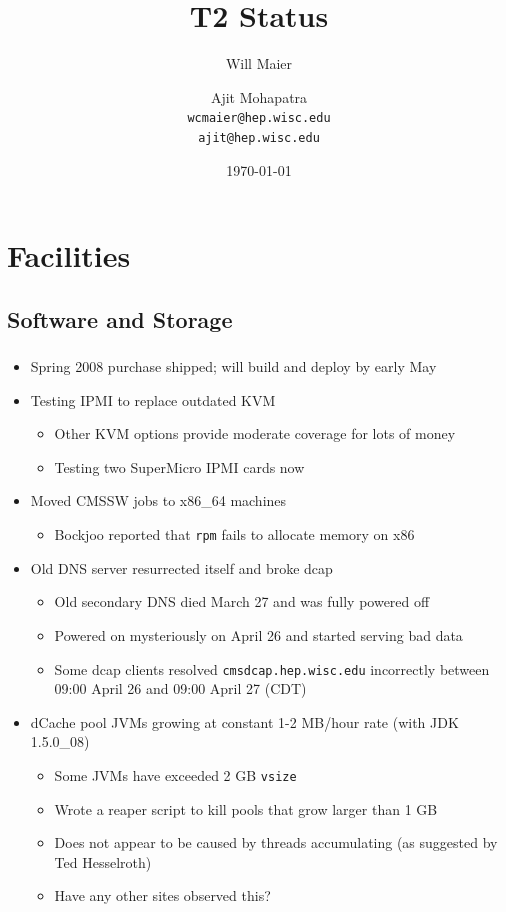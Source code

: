 \documentclass{beamer}
\title{T2 Status}
\author[Maier, Mohapatra]{
    Will Maier \and Ajit Mohapatra\\ 
    {\tt wcmaier@hep.wisc.edu}\\
    {\tt ajit@hep.wisc.edu}}
\institute[Wisconsin]{University of Wisconsin - High Energy Physics}
\date{\today}
\begin{document}
\begin{frame}
    \titlepage
\end{frame}


\section{Facilities}
\subsection{Software and Storage}
\begin{frame}
\frametitle{}
\begin{itemize}
    \item Spring 2008 purchase shipped; will build and deploy by early May
    \item Testing IPMI to replace outdated KVM
    \begin{itemize}
        \item Other KVM options provide moderate coverage for lots of money
        \item Testing two SuperMicro IPMI cards now
    \end{itemize}
    \item Moved CMSSW jobs to x86\_64 machines
    \begin{itemize}
        \item Bockjoo reported that {\tt rpm} fails to allocate memory on x86
    \end{itemize}
    \item Old DNS server resurrected itself and broke dcap
    \begin{itemize}
        \item Old secondary DNS died March 27 and was fully powered off
        \item Powered on mysteriously on April 26 and started serving bad data
        \item Some dcap clients resolved {\tt cmsdcap.hep.wisc.edu} incorrectly between 09:00 April 26 and 09:00 April 27 (CDT)
    \end{itemize}
    \item dCache pool JVMs growing at constant 1-2 MB/hour rate (with JDK 1.5.0\_08)
    \begin{itemize}
        \item Some JVMs have exceeded 2 GB {\tt vsize}
        \item Wrote a reaper script to kill pools that grow larger than 1 GB
        \item Does not appear to be caused by threads accumulating (as suggested by Ted Hesselroth)
        \item Have any other sites observed this?
    \end{itemize}
\end{itemize}
\end{frame}
\end{document}
